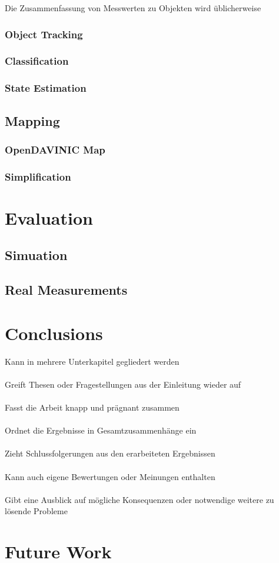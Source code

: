 \documentclass[11pt,oneside,openright]{mpreport}
\begin{document}
Die Zusammenfassung von Messwerten zu Objekten wird üblicherweise

\subsection{Object Tracking}

\subsection{Classification}

\subsection{State Estimation}


\section{Mapping}
\subsection{OpenDAVINIC Map}
\subsection{Simplification}




\chapter{Evaluation}

\section{Simuation}
\section{Real Measurements}
\chapter{Conclusions}
Kann in mehrere Unterkapitel gegliedert werden\\\\
Greift Thesen oder Fragestellungen aus der Einleitung wieder auf\\\\
Fasst die Arbeit knapp und prägnant zusammen\\\\
Ordnet die Ergebnisse in Gesamtzusammenhänge ein\\\\
Zieht Schlussfolgerungen aus den erarbeiteten Ergebnissen\\\\
Kann auch eigene Bewertungen oder Meinungen enthalten\\\\
Gibt eine Ausblick auf mögliche Konsequenzen oder notwendige weitere zu lösende Probleme
\chapter{Future Work}

\printbibliography
\end{document}
